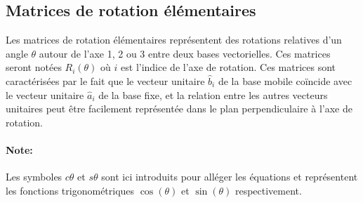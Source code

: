 \newpage
\subsection{Matrices de rotation élémentaires}

Les matrices de rotation élémentaires représentent des rotations relatives d'un angle $\theta$ autour de l'axe 1, 2 ou 3 entre deux bases vectorielles. Ces matrices seront notées $R_i(\theta)$ où $i$ est l'indice de l'axe de rotation. Ces matrices sont caractérisées par le fait que le vecteur unitaire $\hat{b}_i$ de la base mobile coïncide avec le vecteur unitaire $\hat{a}_i$ de la base fixe, et la relation entre les autres vecteurs unitaires peut être facilement représentée dans le plan perpendiculaire à l'axe de rotation. 

\paragraph{Note:} Les symboles $c\theta$ et $s\theta$ sont ici introduits pour alléger les équations et représentent les fonctions trigonométriques $\cos(\theta)$ et $\sin(\theta)$ respectivement.

